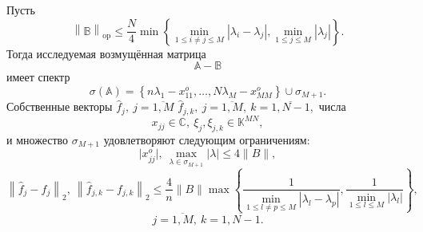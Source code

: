 \begin{ksvthm}
    Пусть
    \[
        \left\| \mathbb{B} \right\|_{\mathrm{op}}
        \leq 
        \frac{N}{4}
         \min\left\{
             \min\limits_{1\leq i{\neq}j \leq M }{|\lambda_i - \lambda_j|},
             \min\limits_{1\leq j \leq M}{|\lambda_j|}
         \right\}.
        \]
    Тогда исследуемая возмущённая матрица
    \[
        \mathbb{A} - \mathbb{B}
        \]
    имеет спектр
    \[
        \sigma\left(\mathbb{A}\right) =
        \left\{
            n\lambda_1 - x_{11}^o, \ldots, N\lambda_M - x_{MM}^o
        \right\}
        \cup \sigma_{M{+}1}.
        \]
    Собственные векторы
    \(
        \hat{f}_j,
        \ j{=}\overline{1,M}
        \)
    \(
        \hat{f}_{j,k},
        \ j{=}\overline{1,M},
        \ k{=}\overline{1,N{-}1},
        \)
    числа
    \[
        x_{jj}{\in}\mathbb{C},
        \ \xi_j, \xi_{j,k}{\in}\mathbb{K}^{MN},
        \]
    и множество \( \sigma_{M{+}1} \)
    удовлетворяют следующим ограничениям:
\[
    \lvert x_{jj}^o\rvert,
    \ \max_{\lambda\in\sigma_{M{+}1}} \lvert\lambda\rvert
    \leq 4\|B\|,
\]
\[
    \left\| \hat{f}_j - f_j \right\|_2,
    \ \left\| \hat{f}_{j,k} - f_{j,k}\right\|_2
    \leq
    \frac4n \|B\|
         \max\left\{
         \frac{1}{
             \min\limits_{1\leq l{\neq}p \leq M }{|\lambda_l - \lambda_p|}},
         \frac{1}{
             \min\limits_{1\leq l \leq M}{|\lambda_l|}}
         \right\},
\]
    \[
        j{=}\overline{1,M},
        \ k{=}\overline{1,N{-}1}.
        \]
\end{ksvthm}
